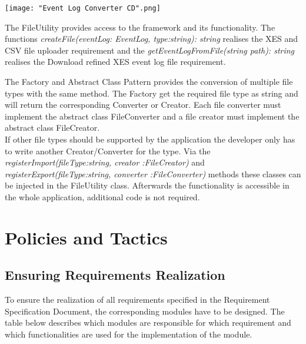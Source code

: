 \documentclass[notitlepage]{article}
\begin{document}
\begin{flushleft}
\begin{landscape}
\texttt{[image: "Event Log Converter CD".png]}
\end{landscape}
The FileUtility provides access to the framework and its functionality.
The functions \textit{createFile(eventLog: EventLog, type:string): string} realises the XES and CSV file uploader requirement and 
the \textit{getEventLogFromFile(string path): string} realises the Download refined XES event log file requirement. 

The Factory and Abstract Class Pattern provides the conversion of multiple file types with the same method. The Factory get the required file type as string and 
will return the corresponding Converter or Creator. Each file converter must implement the abstract class FileConverter and a file creator must implement
the abstract class FileCreator.\\
\medskip
If other file types should be supported by the application the developer only has to write another Creator/Converter for the type.
Via the \textit{registerImport(fileType:string, creator :FileCreator)} and \textit{registerExport(fileType:string, converter :FileConverter)} methods these classes can 
be injected in the FileUtility class. Afterwards the functionality is accessible in the whole application, additional code is not required.






\section{Policies and Tactics}


\subsection{Ensuring Requirements Realization}
To ensure the realization of all requirements specified in the Requirement Specification Document, the corresponding modules have to be designed.
The table below describes which modules are responsible for which requirement and which functionalities are used for the implementation of the module. \\


\end{flushleft}
\end{document}

